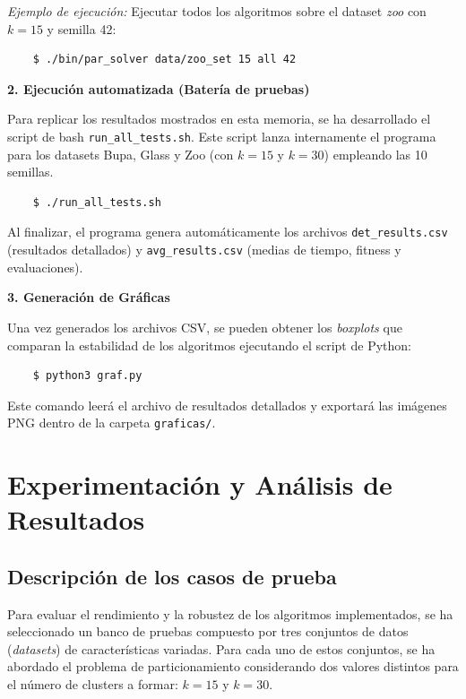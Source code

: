 \documentclass[a4paper,12pt]{article}%
\begin{document}
\noindent \textit{Ejemplo de ejecución:} Ejecutar todos los algoritmos sobre el dataset \textit{zoo} con $k=15$ y semilla 42:
\begin{verbatim}
	$ ./bin/par_solver data/zoo_set 15 all 42
\end{verbatim}

\vspace{0.3cm}
\noindent\textbf{2. Ejecución automatizada (Batería de pruebas)}

Para replicar los resultados mostrados en esta memoria, se ha desarrollado el script de bash  \texttt{run\_all\_tests.sh}. Este script lanza internamente el programa para los datasets Bupa, Glass y Zoo (con $k=15$ y $k=30$) empleando las 10 semillas.
\begin{verbatim}
	$ ./run_all_tests.sh
\end{verbatim}
Al finalizar, el programa genera automáticamente los archivos \texttt{det\_results.csv} (resultados detallados) y \texttt{avg\_results.csv} (medias de tiempo, fitness y evaluaciones).

\vspace{0.3cm}
\noindent\textbf{3. Generación de Gráficas}

Una vez generados los archivos CSV, se pueden obtener los \textit{boxplots} que comparan la estabilidad de los algoritmos ejecutando el script de Python:
\begin{verbatim}
	$ python3 graf.py
\end{verbatim}
Este comando leerá el archivo de resultados detallados y exportará las imágenes PNG dentro de la carpeta \texttt{graficas/}.

\newpage
\section{Experimentación y Análisis de Resultados}

\subsection{Descripción de los casos de prueba}

\noindent Para evaluar el rendimiento y la robustez de los algoritmos implementados, se ha seleccionado un banco de pruebas compuesto por tres conjuntos de datos (\textit{datasets}) de características variadas. Para cada uno de estos conjuntos, se ha abordado el problema de particionamiento considerando dos valores distintos para el número de clusters a formar: $k=15$ y $k=30$.
\end{document}
